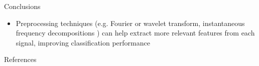 \documentclass[final]{beamer}
\newlength{\onecolwid}
\begin{document}
\begin{frame}[t]
\begin{columns}[t]
\begin{column}{\onecolwid}
\begin{block}{Conclusions}
\begin{itemize}
        \item Preprocessing techniques (e.g. Fourier or wavelet transform, instantaneous frequency
            decompositions \cite{chui_signal_2016}) can help extract more relevant features from
            each signal, improving classification performance
    \end{itemize}
\end{block}


\begin{block}{References}

\footnotesize{
\vspace{0.75in}}

\end{block}


\end{column}    %


% 
% 
% 



\end{columns}
\end{frame}
\end{document}
